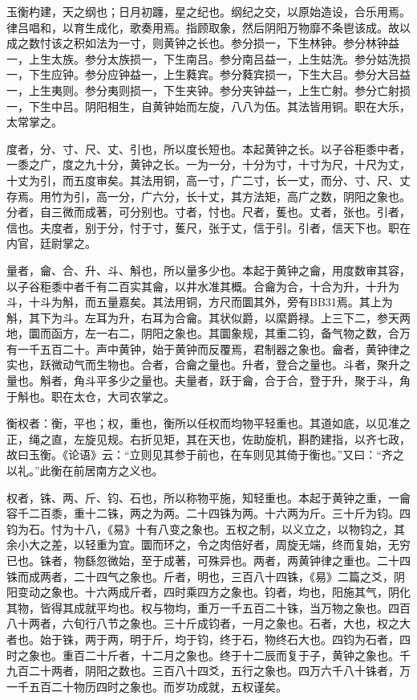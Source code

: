 \documentclass[]{article}
\begin{document}
玉衡杓建，天之纲也；日月初躔，星之纪也。纲纪之交，以原始造设，合乐用焉。律吕唱和，以育生成化，歌奏用焉。指顾取象，然后阴阳万物靡不条鬯该成。故以成之数忖该之积如法为一寸，则黄钟之长也。参分损一，下生林钟。参分林钟益一，上生太族。参分太族损一，下生南吕。参分南吕益一，上生姑洗。参分姑洗损一，下生应钟。参分应钟益一，上生蕤宾。参分蕤宾损一，下生大吕。参分大吕益一，上生夷则。参分夷则损一，下生夹钟。参分夹钟益一，上生亡射。参分亡射损一，下生中吕。阴阳相生，自黄钟始而左旋，八八为伍。其法皆用铜。职在大乐，太常掌之。

度者，分、寸、尺、丈、引也，所以度长短也。本起黄钟之长。以子谷秬黍中者，一黍之广，度之九十分，黄钟之长。一为一分，十分为寸，十寸为尺，十尺为丈，十丈为引，而五度审矣。其法用铜，高一寸，广二寸，长一丈，而分、寸、尺、丈存焉。用竹为引，高一分，广六分，长十丈，其方法矩，高广之数，阴阳之象也。分者，自三微而成著，可分别也。寸者，忖也。尺者，蒦也。丈者，张也。引者，信也。夫度者，别于分，忖于寸，蒦尺，张于丈，信于引。引者，信天下也。职在内官，廷尉掌之。

量者，龠、合、升、斗、斛也，所以量多少也。本起于黄钟之龠，用度数审其容，以子谷秬黍中者千有二百实其龠，以井水准其概。合龠为合，十合为升，十升为斗，十斗为斛，而五量嘉矣。其法用铜，方尺而圜其外，旁有BB31焉。其上为斛，其下为斗。左耳为升，右耳为合龠。其状似爵，以縻爵禄。上三下二，参天两地，圜而函方，左一右二，阴阳之象也。其圜象规，其重二钧，备气物之数，合万有一千五百二十。声中黄钟，始于黄钟而反覆焉，君制器之象也。龠者，黄钟律之实也，跃微动气而生物也。合者，合龠之量也。升者，登合之量也。斗者，聚升之量也。斛者，角斗平多少之量也。夫量者，跃于龠，合于合，登于升，聚于斗，角于斛也。职在太仓，大司农掌之。

衡权者：衡，平也；权，重也，衡所以任权而均物平轻重也。其道如底，以见准之正，绳之直，左旋见规。右折见矩，其在天也，佐助旋机，斟酌建指，以齐七政，故曰玉衡。《论语》云：``立则见其参于前也，在车则见其倚于衡也。''又曰：``齐之以礼。''此衡在前居南方之义也。

权者，铢、两、斤、钧、石也，所以称物平施，知轻重也。本起于黄钟之重，一龠容千二百黍，重十二铢，两之为两。二十四铢为两。十六两为斤。三十斤为钧。四钧为石。忖为十八，《易》十有八变之象也。五权之制，以义立之，以物钧之，其余小大之差，以轻重为宜。圜而环之，令之肉倍好者，周旋无端，终而复始，无穷已也。铢者，物繇忽微始，至于成著，可殊异也。两者，两黄钟律之重也。二十四铢而成两者，二十四气之象也。斤者，明也，三百八十四铢，《易》二篇之爻，阴阳变动之象也。十六两成斤者，四时乘四方之象也。钧者，均也，阳施其气，阴化其物，皆得其成就平均也。权与物均，重万一千五百二十铢，当万物之象也。四百八十两者，六旬行八节之象也。三十斤成钧者，一月之象也。石者，大也，权之大者也。始于铢，两于两，明于斤，均于钧，终于石，物终石大也。四钧为石者，四时之象也。重百二十斤者，十二月之象也。终于十二辰而复于子，黄钟之象也。千九百二十两者，阴阳之数也。三百八十四爻，五行之象也。四万六千八十铢者，万一千五百二十物历四时之象也。而岁功成就，五权谨矣。
\end{document}
